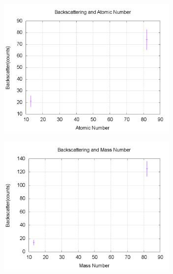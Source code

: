 \documentclass[aps,prl,twocolumn,superscriptaddress]{revtex4-1}
\begin{document}
\begin{figure}[h!]
  \begin{center}
\centerline{\includegraphics[width=3.5in]{zal.png}}
  \end{center}
\end{figure}
\begin{figure}[h!]
  \begin{center}
\centerline{\includegraphics[width=3.5in]{zpb.png}}
  \end{center}
\end{figure}
\end{document}
